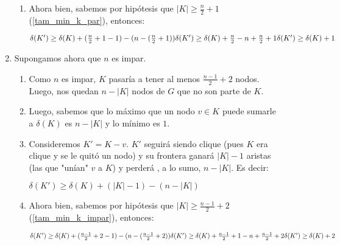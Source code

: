 \begin{description}
\begin{enumerate}
\begin{enumerate}
                    \item Ahora bien, sabemos por hip\'otesis que $|K| \geq \frac{n}{2} + 1$
                        (\ref{tam_min_k_par}), entonces:
                        \bigskip\par$
                            \delta(K') \geq \delta(K) + (\frac{n}{2}+1 - 1) - (n - (\frac{n}{2}+1))\\
                            \delta(K') \geq \delta(K) + \frac{n}{2} - n + \frac{n}{2} + 1\\
                            \delta(K') \geq \delta(K) + 1$
                \end{enumerate}\bigskip

            \item Supongamos ahora que $n$ es impar.
                \begin{enumerate}
                    \item Como $n$ es impar, $K$ pasar\'ia a tener al menos $\frac{n-1}{2} + 2$
                        nodos. Luego, nos quedan $n - |K|$ nodos de $G$ que no son parte de $K$.
                        \label{tam_min_k_impar}

                    \item Luego, sabemos que lo m\'aximo que un nodo $v \in K$  puede
                        sumarle a $\delta(K)$ es $n - |K|$ y lo m\'inimo es $1$.

                    \item Consideremos $K' = K-v$. $K'$ seguir\'a siendo clique
                        (pues $K$ era clique y se le quit\'o un nodo) y su frontera
                        ganar\'a $|K|-1$ aristas (las que "un\'ian" $v$ a $K$) y perder\'a
                        , a lo sumo, $n - |K|$. Es decir:
                        \par\bigskip
                        $\delta(K') \geq \delta(K) + (|K| - 1) - (n - |K|)$
                        \bigskip

                    \item Ahora bien, sabemos por hip\'otesis que $|K| \geq \frac{n-1}{2} + 2$
                        (\ref{tam_min_k_impar}), entonces:
                        \bigskip\par$
                            \delta(K') \geq \delta(K) + (\frac{n-1}{2}+2 - 1) - (n - (\frac{n-1}{2}+2))\\
                            \delta(K') \geq \delta(K) + \frac{n-1}{2}+1 - n + \frac{n-1}{2} + 2\\
                            \delta(K') \geq \delta(K) + 2$
                \end{enumerate}\bigskip


\end{enumerate}
\end{description}
